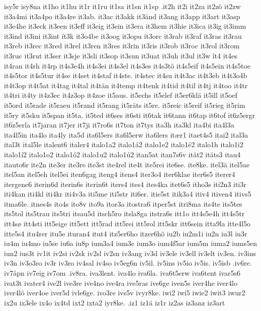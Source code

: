 {{isy5r
isy8na
it1ho
it1hu
it1r
it1ru
it1sa
it1sn
it1sp
.it2h
it2i
it2za
it2zö
it2zw
it3a4mi
it3a4po
it3a4re
it3ab.
it3ac
it3akk
it3änd
it3ang
it3app
it3art
it3asp
it3e4he
it3eck
it3een
it3eff
it3eig
it3ein
it3era
it3hem
it3hie
it3ica
it3ig
it3imm
it3ind
it3ini
it3int
ít3k
it3o4be
it3oog
it3opu
it3orc
it3rab
it3raf
it3ras
it3rau
it3reb
it3rec
it3red
it3rel
it3ren
it3res
it3rin
it3ris
it3rob
it3roc
it3rol
it3rom
it3ruc
it3rut
it3ser
it3sje
it3sli
it3sop
it3sun
it3uat
it3uh
it3ul
it3w
ît4
it4es
it4ran
it4rh
it4rp
it4s3e4h
it4s3ei
it4s3el
it4s3es
it4s3tö
it4s5eif
it4s5ein
it4s5toe
it4s5tor
it4s5tur
it4se
it4set
it4staf
it4ste.
it4stec
it4su
it4t3ac
it4t3eb
it4t3o4b
it4t3op
it4t5at
it4tag
it4tal
it4tän
it4temp
it4tenk
it4tid
it4til
it4tj
it4too
it4tr
it4tri
it4ty
it4z3ec
it4z3op
it4zoe
it5aus.
it5echs
it5elef
it5er6klä
it5ill
it5oef
it5ord
it5rade
it5raeu
it5rand
it5rang
it5räts
it5re.
it5reic
it5reif
it5rieg
it5rim
it5ry
it5sku
it5span
it5ta.
it5ted
it6ses
it6sti
it6tak
it6tann
it6tap
it6tof
it6z5ergr
it6z5erla
it7jaran
it7jer
it7ji
it7ro6s
it7ton
it7tys
ita3h
ita3kl
ita4bi
ita4l3a
ita4l5in
ita4lo
ita4ly
ita5d
ita6l5ers
ita6l5erw
ita6lers
itær1
itaet4s5
itai2
ital3a
ital3t
ital5le
italent6
italer4
italo1a2
italo1á2
italo1e2
italo1é2
italo1h
italo1i2
italo1í2
italo1o2
italo1ó2
italo1u2
italo1ú2
itan5at
itan7s6v
ität2
itäts3
itau4
itauto6r
ite2n
ite3er
ite3re
ite3st
ite4rel
ite4t
ite5rei
ite6se.
ite8ke.
itel3ä
itel5ae
itel5an
itel5eh
itel5ei
iten6gag
iteng4
itens4
iter3o4
iter6klae
iter6s5
iterer4
itergene6
iterin6d
iterin6s
iterin6t
iters4
ites4
ites4ka
itet6s5
itho3s
iti2n3
iti3r
iti4kan
iti4kl
iti4kr
iti4v3a
iti5me
iti5str
iti6er.
itie5st
itik3a4
itiv4
itiven4
itivs5
itma6le.
itnes4s
ito4s
ito8v
ito9a
itor3a
itostra6
itper5st
itri8ma
its4te
its5tes
its5tol
its5trau
its5tri
itsau5d
itsch5ro
itsla8ga
itstra6s
itt1o
itt4s5e4h
itt4s5tr
itt4sø
itt4sti
itt5eige
itt5ett
itt5rad
itt5rei
itt5rol
itt5skr
itt6sein
itta9la
itte4l5o
itte5s4
itu4rer
itu5e
ituran4
itut4
itz5er6ho
itzer6hö
iu2b
iu2m1i
iu2n
iu3l
iu3r
iu4m
iu4mo
iu5se
iu6a
iu8p
ium3a4
ium3e
ium3o
ium4f5ar
ium5m
iuma2
iums5en
iun2
ius3t
iv1it
iv2si
iv2sk
iv2sl
iv2sn
iv3ang
iv3d
iv3ele
iv3ell
iv3elt
iv3en.
iv3ins
iv3n
iv3o3ro
iv3r
iv3ro
iv4sal
iv4so
iv5eg6n
iv5il.
iv5ins
iv5io
iv5is.
iv5isb
.iv6re.
iv7åpn
iv7eig
iv7om
.iv8ra.
iva3lent.
iva4lo
iva6la.
iva6t5erw
iva6tent
ivar5s6
ivat3t
ivater4
ive2l
ive3re
ive4no
ive4ra
ive5ras
ive6ge
iven5s
iver4he
iver4lo
iver4lö
iver4oe
iver5d
ivle6ge.
ivo3re
ivs5v
ivyr8ke.
iwi2
iwi5
iwie2
iwit3
iwur2
ix2u
ix3ele
ix4o
ix4td
ixt2
ixta2
iyr8ke.
.iz1
iz1ä
iz1r
iz2as
iz3anz
iz3art
}}
